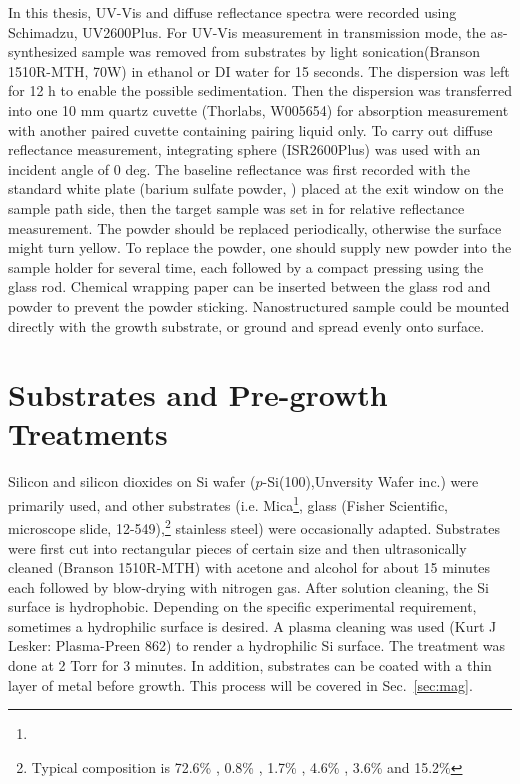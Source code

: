 In this thesis, UV-Vis and diffuse reflectance spectra were recorded using Schimadzu, UV2600Plus. For UV-Vis measurement in transmission mode, the as-synthesized sample was removed from substrates by light sonication(Branson 1510R-MTH, 70W) in ethanol or DI water for 15 seconds. The dispersion was left for 12 h to enable the possible sedimentation. Then the dispersion was transferred into one 10 mm quartz cuvette (Thorlabs, W005654) for absorption measurement with another paired cuvette containing pairing liquid only. To carry out diffuse reflectance measurement, integrating sphere (ISR2600Plus) was used with an incident angle of 0 deg. The baseline reflectance was first recorded with the standard white plate (barium sulfate powder, ) placed at the exit window on the sample path side, then the target sample was set in for relative reflectance measurement. The  powder should be replaced periodically, otherwise the surface might turn yellow. To replace the  powder, one should supply new powder into the sample holder for several time, each followed by a compact pressing using the glass rod. Chemical wrapping paper can be inserted between the glass rod and  powder to prevent the powder sticking. Nanostructured sample could be mounted directly with the growth substrate, or ground and spread evenly onto  surface.


\section{Substrates and Pre-growth Treatments}\label{ch2sub}

Silicon and silicon dioxides on Si wafer ($p$-Si(100),Unversity Wafer inc.) were primarily used, and other substrates (i.e. Mica\footnote{ }, glass (Fisher Scientific, microscope slide, 12-549),\footnote{Typical composition is 72.6\% , 0.8\% , 1.7\% , 4.6\% , 3.6\%  and 15.2\% } stainless steel) were occasionally adapted. Substrates were first cut into rectangular pieces of certain size and then ultrasonically cleaned (Branson 1510R-MTH) with acetone and alcohol for about 15 minutes each followed by blow-drying with nitrogen gas. After solution cleaning, the Si surface is hydrophobic. Depending on the specific experimental requirement, sometimes a hydrophilic surface is desired. A plasma cleaning was used (Kurt J Lesker: Plasma-Preen 862) to render a hydrophilic Si surface. The treatment was done at 2 Torr  for 3 minutes. In addition, substrates can be coated with a thin layer of metal before growth. This process will be covered  in Sec.~\ref{sec:mag}.

